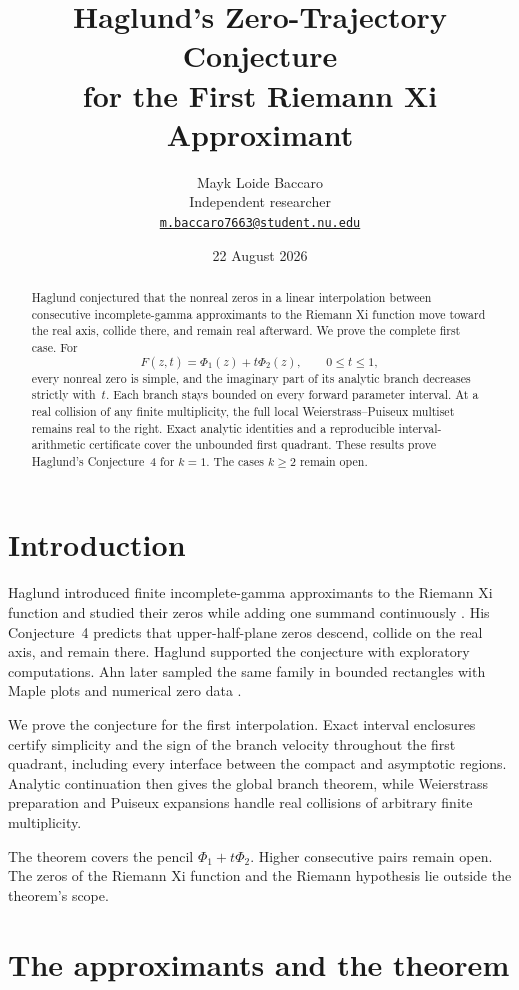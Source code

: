 \documentclass[11pt,a4paper]{amsart}
\title[Haglund's zero-trajectory conjecture for $k=1$]
{Haglund's Zero-Trajectory Conjecture\\
for the First Riemann Xi Approximant}
\author[Mayk Loide Baccaro]{Mayk Loide Baccaro\\
Independent researcher\\
\href{mailto:m.baccaro7663@student.nu.edu}{\texttt{m.baccaro7663@student.nu.edu}}}
\date{22 August 2026}
\theoremstyle{definition}
\theoremstyle{remark}
\newcommand{\PhiOne}{\Phi_{1}}
\newcommand{\PhiTwo}{\Phi_{2}}
\begin{document}
\begin{abstract}
Haglund conjectured that the nonreal zeros in a linear interpolation between
consecutive incomplete-gamma approximants to the Riemann Xi function move
toward the real axis, collide there, and remain real afterward.  We prove the
complete first case.  For
\[
  F(z,t)=\PhiOne(z)+t\PhiTwo(z),\qquad 0\leq t\leq 1,
\]
every nonreal zero is simple, and the imaginary part of its analytic branch
decreases strictly with~$t$.  Each branch stays bounded on every forward
parameter interval.  At a real collision of any finite multiplicity, the
full local Weierstrass--Puiseux multiset remains real to the right.  Exact
analytic identities and a reproducible interval-arithmetic certificate cover
the unbounded first quadrant.  These results prove Haglund's Conjecture~4 for
$k=1$.  The cases $k\geq2$ remain open.
\end{abstract}

\maketitle

\section{Introduction}

Haglund introduced finite incomplete-gamma approximants to the Riemann Xi
function and studied their zeros while adding one summand continuously
\cite{Haglund2011}.  His Conjecture~4 predicts that upper-half-plane zeros
descend, collide on the real axis, and remain there.  Haglund supported the
conjecture with exploratory computations.  Ahn later sampled the same family
in bounded rectangles with Maple plots and numerical zero data
\cite[pp.~29--33, Appendix~D]{Ahn2012}.

We prove the conjecture for the first interpolation.  Exact interval
enclosures certify simplicity and the sign of the branch velocity throughout
the first quadrant, including every interface between the compact and
asymptotic regions.  Analytic continuation then gives the global branch
theorem, while Weierstrass preparation and Puiseux expansions handle real
collisions of arbitrary finite multiplicity.

The theorem covers the pencil $\PhiOne+t\PhiTwo$.  Higher consecutive pairs
remain open.  The zeros of the Riemann Xi function and the Riemann hypothesis
lie outside the theorem's scope.

\section{The approximants and the theorem}
\end{document}
